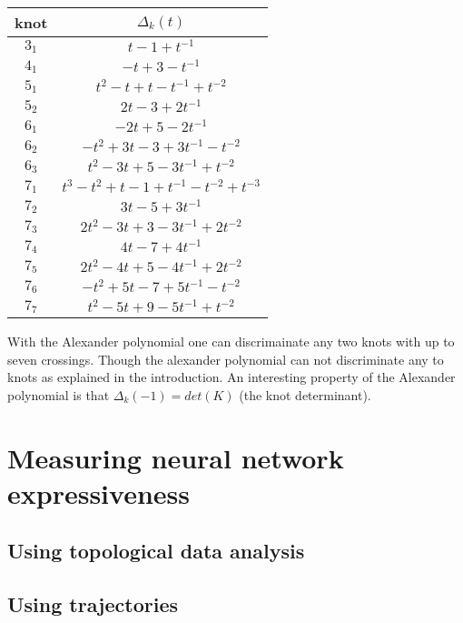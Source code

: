 \documentclass[12pt, a4paper]{article}
\begin{document}
\begin{center}
  \begin{tabular}{| c | c |}
    \hline
    knot & $\Delta_k(t)$\\
    \hline
    $3_1$ & $t - 1 + t^{-1}$\\
    \hline
    $4_1$ & $-t + 3 -t^{-1}$\\
    \hline
    $5_1$ & $t^2 - t + t - t^{-1} + t^{-2}$\\
    \hline
    $5_2$ & $2t - 3 + 2t^{-1}$\\
    \hline
    $6_1$ & $-2t + 5 -2t^{-1}$\\
    \hline
    $6_2$ & $-t^2 + 3t -3 + 3t^{-1} - t^{-2}$\\
    \hline
    $6_3$ & $t^2 - 3t +5 -3t^{-1} + t^{-2}$\\
    \hline
    $7_1$ & $t^3 - t^2 +t -1 + t^{-1} - t^{-2} + t^{-3}$\\
    \hline
    $7_2$ & $3t -5 + 3t^{-1}$\\
    \hline
    $7_3$ & $2t^2 - 3t + 3 - 3t^{-1} + 2t^{-2}$\\
    \hline
    $7_4$ & $4t -7 + 4t^{-1}$\\
    \hline
    $7_5$ & $2t^2 - 4t + 5 - 4t^{-1} + 2t^{-2}$\\
    \hline
    $7_6$ & $-t^2 +5t -7 +5t^{-1} - t^{-2}$\\
    \hline
    $7_7$ & $t^2 -5t +9 -5t^{-1} + t^{-2}$\\
    \hline
  \end{tabular}
\end{center}

With the Alexander polynomial one can discrimainate any two knots with up to seven crossings. Though the alexander polynomial can not discriminate any to knots as explained in the introduction. An interesting property of the Alexander polynomial is that $\Delta_k(-1) = det(K)$ (the knot determinant).

\newpage
\thispagestyle{empty}
\mbox{}
\newpage

\section{Measuring neural network expressiveness}

\subsection{Using topological data analysis}

\subsection{Using trajectories}
\end{document}
